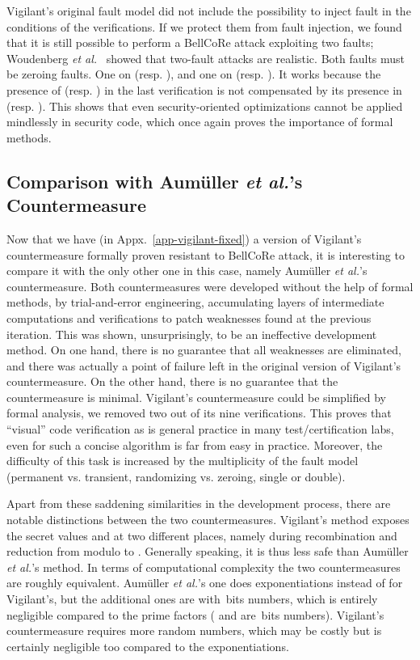 \documentclass[10pt]{article}
\theoremstyle{definition}
\theoremstyle{theorem}
\newcommand{\etal}{\textit{et al.}\xspace}
\begin{document}
Vigilant's original fault model did not include the possibility to inject fault in the conditions of the verifications.
If we protect them from fault injection, we found that it is still possible to perform a BellCoRe attack exploiting two faults; Woudenberg \etal~\cite{DBLP:conf/fdtc/WoudenbergWM11} showed that two-fault attacks are realistic.
Both faults must be zeroing faults.
One on  (resp. ), and one on  (resp. ).
It works because the presence of  (resp. ) in the last verification is not compensated by its presence in  (resp. ).
This shows that even security-oriented optimizations cannot be applied mindlessly in security code,
which once again proves the importance of formal methods.

\subsection{Comparison with Aumüller \etal's Countermeasure}

Now that we have (in Appx.~\ref{app-vigilant-fixed}) a version of Vigilant's countermeasure formally proven resistant to BellCoRe attack, it is interesting to compare it with the only other one in this case, namely Aumüller \etal's countermeasure.
Both countermeasures were developed without the help of formal methods, by trial-and-error engineering, accumulating layers of intermediate computations and verifications to patch weaknesses found at the previous iteration.
This was shown, unsurprisingly, to be an ineffective development method.
On one hand, there is no guarantee that all weaknesses are eliminated, and there was actually a point of failure left in the original version of Vigilant's countermeasure.
On the other hand, there is no guarantee that the countermeasure is minimal.
Vigilant's countermeasure could be simplified by formal analysis, we removed two out of its nine verifications.
This proves that ``visual'' code verification as is general practice in many test/certification labs, even for such a concise algorithm is far from easy in practice.
Moreover, the difficulty of this task is increased by the multiplicity of the fault model (permanent vs. transient, randomizing vs. zeroing, single or double).

Apart from these saddening similarities in the development process, there are notable distinctions between the two countermeasures.
Vigilant's method exposes the secret values  and  at two different places, namely during recombination and reduction from modulo  to .
Generally speaking, it is thus less safe than Aumüller \etal's method.
In terms of computational complexity the two countermeasures are roughly equivalent.
Aumüller \etal's one does  exponentiations instead of  for Vigilant's, but the  additional ones are with \,bits numbers, which is entirely negligible compared to the prime factors ( and  are \,bits numbers).
Vigilant's countermeasure requires more random numbers, which may be costly but is certainly negligible too compared to the exponentiations.
\end{document}

